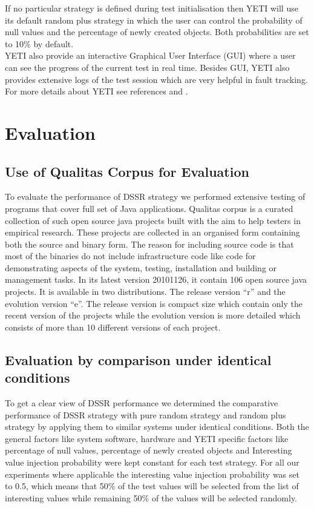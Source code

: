 \documentclass[conference]{IEEEtran}
\begin{document}
If no particular strategy is defined during test initialisation then YETI will use its default random plus strategy in which the user can control the probability of null values and the percentage of newly created objects. Both probabilities are set to 10\% by default. \\
\indent YETI also provide an interactive Graphical User Interface (GUI) where a user can see the progress of the current test in real time. Besides GUI, YETI also provides extensive logs of the test session which are very helpful in fault tracking. For more details about YETI see references \cite{Oriol2010a} and \cite{Oriol2010}.



\section{Evaluation}
\subsection{Use of Qualitas Corpus for Evaluation}
To evaluate the performance of DSSR strategy we performed extensive testing of programs that cover full set of Java applications. Qualitas corpus \cite{Tempero2010a} is a curated collection of such open source java projects built with the aim to help testers in empirical research. These projects are collected in an organised form containing both the source and binary form. The reason for including source code is that most of the binaries do not include infrastructure code like code for demonstrating aspects of the system, testing, installation and building or management tasks. In its latest version 20101126, it contain 106 open source java projects. It is available in two distributions. The release version ``r'' and the evolution version ``e''. The release version is compact size which contain only the recent version of the projects while the evolution version is more detailed which consists of more than 10 different versions of each project.\\

\subsection{Evaluation by comparison under identical conditions}
To get a clear view of DSSR performance we determined the comparative performance of DSSR strategy with pure random strategy and random plus strategy by applying them to similar systems under identical conditions. Both the general factors like system software, hardware and YETI specific factors like percentage of null values, percentage of newly created objects and Interesting value injection probability were  kept constant for each test strategy. For all our experiments where applicable the interesting value injection probability was set to 0.5, which means that 50\% of the test values will be selected from the list of interesting values while remaining 50\% of the values will be selected randomly.\\
\end{document}
